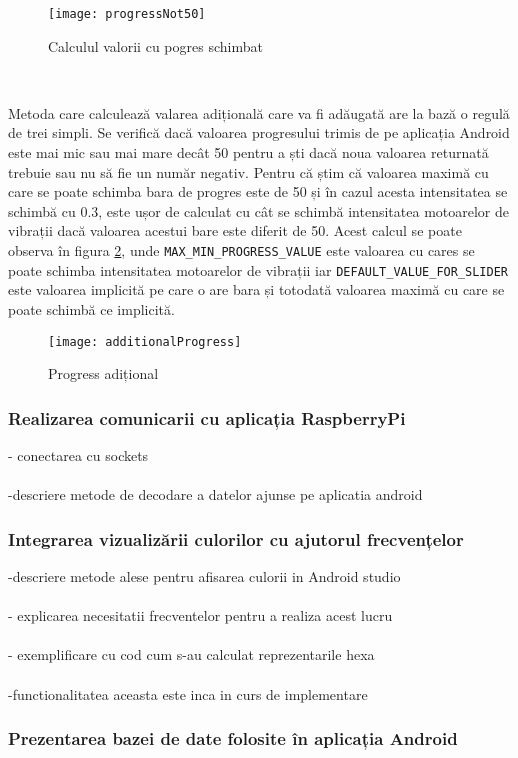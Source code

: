 \documentclass[../IoMusT.tex]{subfiles}
\begin{document}
\begin{figure}[h]
\centering
\texttt{[image: progressNot50]}
\caption{Calculul valorii cu pogres schimbat}
\label{fig:not50}
\end{figure} 
\\
\par Metoda care calculează valarea adițională care va fi adăugată are la bază o regulă de trei simpli. Se verifică dacă valoarea progresului trimis de pe aplicația Android este mai mic sau mai mare decât 50 pentru a ști dacă noua valoarea returnată trebuie sau nu să fie un număr negativ. Pentru că știm că valoarea maximă cu care se poate schimba bara de progres este de 50 și în cazul acesta intensitatea se schimbă cu 0.3, este ușor de calculat cu cât se schimbă intensitatea motoarelor de vibrații dacă valoarea acestui bare este diferit de 50. Acest calcul se poate observa în figura \ref{fig:additionalProgress}, unde \verb|MAX_MIN_PROGRESS_VALUE| este valoarea cu cares se poate schimba intensitatea motoarelor de vibrații iar \verb|DEFAULT_VALUE_FOR_SLIDER| este valoarea implicită pe care o are bara și totodată valoarea maximă cu care se poate schimbă ce implicită.
\begin{figure}[h]
\centering
\texttt{[image: additionalProgress]}
\caption{Progress adițional}
\label{fig:additionalProgress}
\end{figure} 
\subsubsection{Realizarea comunicarii cu aplicația RaspberryPi}
- conectarea cu sockets
\\
\\
-descriere metode de decodare a datelor ajunse pe aplicatia android
\subsubsection{Integrarea vizualizării culorilor cu ajutorul frecvențelor}
-descriere metode alese pentru afisarea culorii in Android studio
\\
\\
- explicarea necesitatii frecventelor pentru a realiza acest lucru
\\
\\
- exemplificare cu cod cum s-au calculat reprezentarile hexa
\\
\\
-functionalitatea aceasta este inca in curs de implementare
\subsubsection{Prezentarea bazei de date folosite în aplicația Android}
\end{document}
